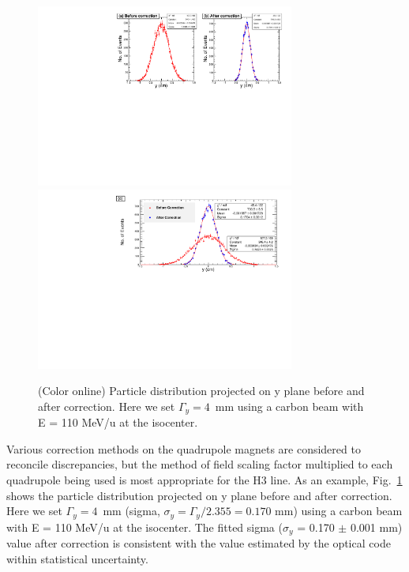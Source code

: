 \documentclass[jkps,preprint,fleqn,showpacs,showkeys]{revtex4}
\begin{document}
\begin{figure}[h]
  \begin{center}
    \includegraphics[width=8.5cm]{Fig08-1.pdf}
    \includegraphics[width=8.5cm]{Fig08-2.pdf}        
    \caption{(Color online) Particle distribution projected on y plane before and after correction.
      Here we set $\Gamma_{y} = 4$~mm using a carbon beam with E = 110 MeV/u at the isocenter.}
    \label{fig7}
  \end{center}
\end{figure}
Various correction methods on the quadrupole magnets are considered to reconcile discrepancies,
but the method of field scaling factor multiplied to each quadrupole being used is most appropriate for the H3 line.
As an example, Fig.~\ref{fig7} shows the particle distribution projected on y plane before and after correction.
Here we set $\Gamma_{y} = 4$~mm (sigma, $\sigma_{y} = \Gamma_{y}/2.355 = 0.170$ mm) using a carbon beam with E = 110 MeV/u at the isocenter.
The fitted sigma ($\sigma_{y}$ = 0.170 $\pm$ 0.001 mm) value after correction is consistent with the value estimated
by the optical code within statistical uncertainty.
\end{document}
